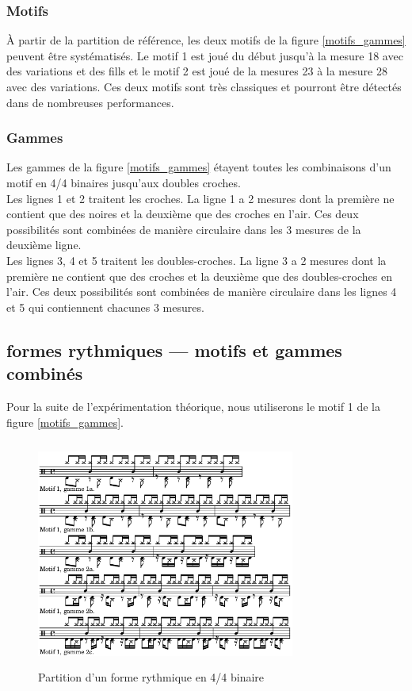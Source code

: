 \subsubsection{Motifs}
À partir de la partition de référence, les deux motifs de la figure \ref{motifs_gammes} peuvent être systématisés. Le motif 1 est joué du début jusqu’à la mesure 18 avec des variations et des fills et le motif 2 est joué de la mesures 23 à la mesure 28 avec des variations. Ces deux motifs sont très classiques et pourront être détectés dans de nombreuses performances.\\

\subsubsection{Gammes}
Les gammes de la figure \ref{motifs_gammes} étayent toutes les combinaisons d’un motif en 4/4 binaires jusqu’aux doubles croches.\\
Les lignes 1 et 2 traitent les croches. La ligne 1 a 2 mesures dont la première ne contient que des noires et la deuxième que des croches en l’air. Ces deux possibilités sont combinées de manière circulaire dans les 3 mesures de la deuxième ligne.\\
Les lignes 3, 4 et 5 traitent les doubles-croches. La ligne 3 a 2 mesures dont la première ne contient que des croches et la deuxième que des doubles-croches en l’air. Ces deux possibilités sont combinées de manière circulaire dans les lignes 4 et 5 qui contiennent chacunes 3 mesures.

\subsection*{formes rythmiques — motifs et gammes combinés}
Pour la suite de l’expérimentation théorique, nous utiliserons le motif 1 de la figure \ref{motifs_gammes}.\\
\begin{figure}[h]
	\centering
	\includegraphics[height=75mm, width=85mm]{z_images/4_experimentations/2_experimentation_theorique/2_systeme_4-4_binaire.png}
	\caption{Partition d’un forme rythmique en 4/4 binaire}
	\label{sys_binaire}
\end{figure}
